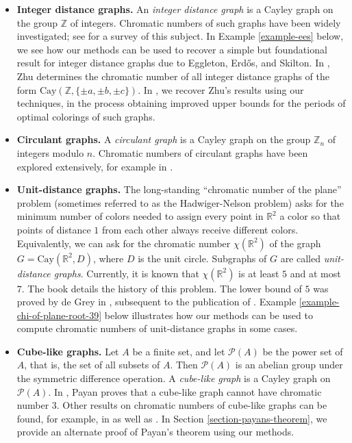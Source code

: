 \documentclass{article}
\theoremstyle{definition}
\theoremstyle{remark}
\begin{document}
\begin{itemize}

\item \textbf{Integer distance graphs.}  An \emph{integer distance graph} is a Cayley graph on the group $\mathbb{Z}$ of integers.  Chromatic numbers of such graphs have been widely investigated; see \cite{Liu} for a survey of this subject.  In Example \ref{example-ees} below, we see how our methods can be used to recover a simple but foundational result for integer distance graphs due to Eggleton, Erd\H{o}s, and Skilton.  In \cite{Zhu}, Zhu determines the chromatic number of all integer distance graphs of the form $\text{Cay}(\mathbb{Z},\{\pm a, \pm b, \pm c\})$.  In \cite{Cervantes-Krebs-Zhu}, we recover Zhu's results using our techniques, in the process obtaining improved upper bounds for the periods of optimal colorings of such graphs.

\item \textbf{Circulant graphs.} A \emph{circulant graph} is a Cayley graph on the group $\mathbb{Z}_n$ of integers modulo $n$.  Chromatic numbers of circulant graphs have been explored extensively, for example in \cite{Barajas-Serra, Heuberger, Ilic, Meszka, Nicoloso}.

\item \textbf{Unit-distance graphs.} The long-standing ``chromatic number of the plane'' problem (sometimes referred to as the Hadwiger-Nelson problem) asks for the minimum number of colors needed to assign every point in $\mathbb{R}^2$ a color so that points of distance $1$ from each other always receive different colors.  Equivalently, we can ask for the chromatic number $\chi(\mathbb{R}^2)$ of the graph $G=\text{Cay}(\mathbb{R}^2,D)$, where $D$ is the unit circle.  Subgraphs of $G$ are called \emph{unit-distance graphs}.  Currently, it is known that $\chi(\mathbb{R}^2)$ is at least $5$ and at most $7$.  The book \cite{Soifer} details the history of this problem.  The lower bound of $5$ was proved by de Grey in \cite{deGrey}, subsequent to the publication of \cite{Soifer}.  Example \ref{example-chi-of-plane-root-39} below illustrates how our methods can be used to compute chromatic numbers of unit-distance graphs in some cases.

\item \textbf{Cube-like graphs.}  Let $A$ be a finite set, and let $\mathcal{P}(A)$ be the power set of $A$, that is, the set of all subsets of $A$.  Then $\mathcal{P}(A)$ is an abelian group under the symmetric difference operation.  A \emph{cube-like graph} is a Cayley graph on $\mathcal{P}(A)$.  In \cite{Payan}, Payan proves that a cube-like graph cannot have chromatic number $3$.  Other results on chromatic numbers of cube-like graphs can be found, for example, in \cite{Kokkala-et-al} as well as \cite[Section 9.7]{Jensen}.  In Section \ref{section-payans-theorem}, we provide an alternate proof of Payan's theorem using our methods.


\end{itemize}
\end{document}
